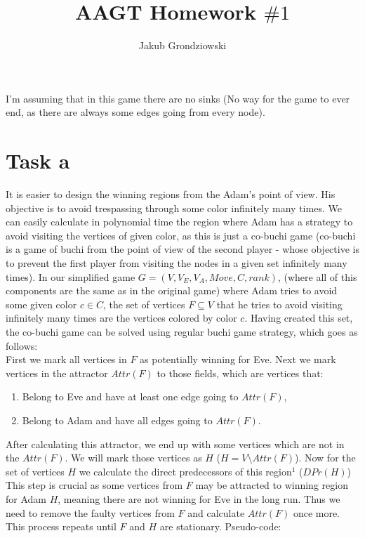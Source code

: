 \documentclass{article}
\title{AAGT Homework $\#1$}
\author{Jakub Grondziowski}
\date{}
\begin{document}
\maketitle

I'm assuming that in this game there are no sinks (No way for the game to ever end, as there are always some edges going from every node).

\section{Task a}

It is easier to design the winning regions from the Adam's point of view. His objective is to avoid trespassing through some color infinitely many times. We can easily calculate in polynomial time the region where Adam has a strategy to avoid visiting the vertices of given color, as this is just a co-buchi game (co-buchi is a game of buchi from the point of view of the second player - whose objective is to prevent the first player from visiting the nodes in a given set infinitely many times). In our simplified game $G = (V, V_{E}, V_{A}, Move, C, rank)$, (where all of this components are the same as in the original game) where Adam tries to avoid some given color $c \in C$, the set of vertices $F \subseteq V$ that he tries to avoid visiting infinitely many times are the vertices colored by color $c$. Having created this set, the co-buchi game can be solved using regular buchi game strategy, which goes as follows: \\

First we mark all vertices in $F$ as potentially winning for Eve. Next we mark vertices in the attractor $Attr(F)$ to those fields, which are vertices that:
\begin{enumerate}
  \item Belong to Eve and have at least one edge going to $Attr(F)$,
  \item Belong to Adam and have all edges going to $Attr(F)$.
\end{enumerate}
After calculating this attractor, we end up with some vertices which are not in the $Attr(F)$. We will mark those vertices as $H$ ($H = V \setminus Attr(F)$). Now for the set of vertices $H$ we calculate the direct predecessors of this region$^{1}$ ($DPr(H)$) This step is crucial as some vertices from $F$ may be attracted to winning region for Adam $H$, meaning there are not winning for Eve in the long run. Thus we need to remove the faulty vertices from $F$ and calculate $Attr(F)$ once more. This process repeats until $F$ and $H$ are stationary. Pseudo-code: \\
\end{document}
